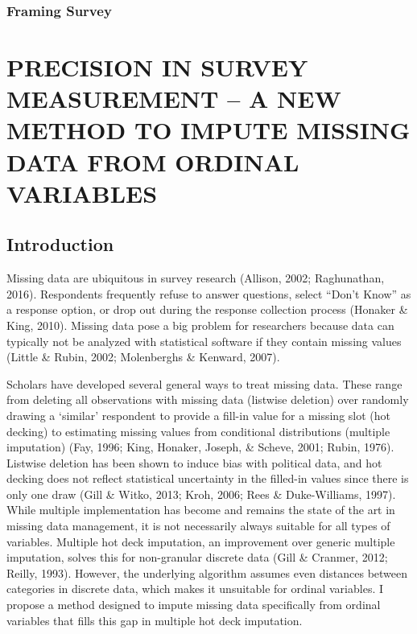 \documentclass[12pt,econ]{sources/authesis}
\begin{document}
\hypertarget{ordblock-results-framing}{%
\subsection{Framing Survey}\label{ordblock-results-framing}}

\hypertarget{ordmiss}{%
\chapter{PRECISION IN SURVEY MEASUREMENT -- A NEW METHOD TO IMPUTE MISSING DATA FROM ORDINAL VARIABLES}\label{ordmiss}}

\hypertarget{ordmiss-intro}{%
\section{Introduction}\label{ordmiss-intro}}

Missing data are ubiquitous in survey research (Allison, 2002; Raghunathan, 2016). Respondents frequently refuse to answer questions, select ``Don't Know'' as a response option, or drop out during the response collection process (Honaker \& King, 2010). Missing data pose a big problem for researchers because data can typically not be analyzed with statistical software if they contain missing values (Little \& Rubin, 2002; Molenberghs \& Kenward, 2007).

Scholars have developed several general ways to treat missing data. These range from deleting all observations with missing data (listwise deletion) over randomly drawing a `similar' respondent to provide a fill-in value for a missing slot (hot decking) to estimating missing values from conditional distributions (multiple imputation) (Fay, 1996; King, Honaker, Joseph, \& Scheve, 2001; Rubin, 1976). Listwise deletion has been shown to induce bias with political data, and hot decking does not reflect statistical uncertainty in the filled-in values since there is only one draw (Gill \& Witko, 2013; Kroh, 2006; Rees \& Duke-Williams, 1997). While multiple implementation has become and remains the state of the art in missing data management, it is not necessarily always suitable for all types of variables. Multiple hot deck imputation, an improvement over generic multiple imputation, solves this for non-granular discrete data (Gill \& Cranmer, 2012; Reilly, 1993). However, the underlying algorithm assumes even distances between categories in discrete data, which makes it unsuitable for ordinal variables. I propose a method designed to impute missing data specifically from ordinal variables that fills this gap in multiple hot deck imputation.
\end{document}
